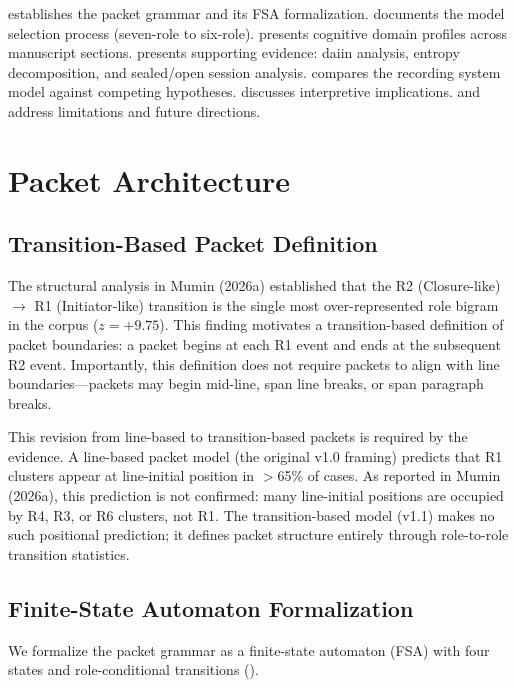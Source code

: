 \documentclass[11pt,a4paper,twocolumn]{article}
\begin{document}
 establishes the packet grammar and its FSA formalization.  documents the model selection process (seven-role to six-role).  presents cognitive domain profiles across manuscript sections.  presents supporting evidence: daiin analysis, entropy decomposition, and sealed/open session analysis.  compares the recording system model against competing hypotheses.  discusses interpretive implications.  and  address limitations and future directions.

\section{Packet Architecture}
\label{sec:packet}

\subsection{Transition-Based Packet Definition}

The structural analysis in Mumin (2026a) established that the R2 (Closure-like) $\to$ R1 (Initiator-like) transition is the single most over-represented role bigram in the corpus ($z = +9.75$). This finding motivates a transition-based definition of packet boundaries: a packet begins at each R1 event and ends at the subsequent R2 event. Importantly, this definition does not require packets to align with line boundaries---packets may begin mid-line, span line breaks, or span paragraph breaks.

This revision from line-based to transition-based packets is required by the evidence. A line-based packet model (the original v1.0 framing) predicts that R1 clusters appear at line-initial position in $>$65\% of cases. As reported in Mumin (2026a), this prediction is not confirmed: many line-initial positions are occupied by R4, R3, or R6 clusters, not R1. The transition-based model (v1.1) makes no such positional prediction; it defines packet structure entirely through role-to-role transition statistics.

\subsection{Finite-State Automaton Formalization}

We formalize the packet grammar as a finite-state automaton (FSA) with four states and role-conditional transitions ().
\end{document}
